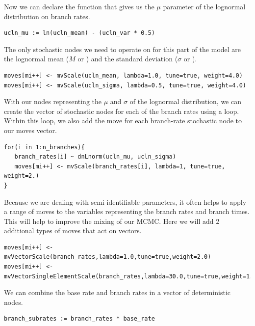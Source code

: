 Now we can declare the function that gives us the $\mu$ parameter of the lognormal distribution on branch rates.
{\tt \begin{snugshade*}
\begin{lstlisting}
ucln_mu := ln(ucln_mean) - (ucln_var * 0.5)
\end{lstlisting}
\end{snugshade*}}

The only stochastic nodes we need to operate on for this part of the model are the lognormal mean ($M$ or ) and the standard deviation ($\sigma$ or ).
{\tt \begin{snugshade*}
\begin{lstlisting}
moves[mi++] <- mvScale(ucln_mean, lambda=1.0, tune=true, weight=4.0)
moves[mi++] <- mvScale(ucln_sigma, lambda=0.5, tune=true, weight=4.0)
\end{lstlisting}
\end{snugshade*}}

With our nodes representing the $\mu$ and $\sigma$ of the lognormal distribution, we can create the vector of stochastic nodes for each of the branch rates using a  loop. 
Within this loop, we also add the move for each branch-rate stochastic node to our moves vector.
{\tt \begin{snugshade*}
\begin{lstlisting}
for(i in 1:n_branches){
   branch_rates[i] ~ dnLnorm(ucln_mu, ucln_sigma)
   moves[mi++] <- mvScale(branch_rates[i], lambda=1, tune=true, weight=2.)
}
\end{lstlisting}
\end{snugshade*}}

Because we are dealing with semi-identifiable parameters, it often helps to apply a range of moves to the variables representing the branch rates and branch times. This will help to improve the mixing of our MCMC.
Here we will add 2 additional types of moves that act on vectors.
{\tt \begin{snugshade*}
\begin{lstlisting}
moves[mi++] <- mvVectorScale(branch_rates,lambda=1.0,tune=true,weight=2.0) 
moves[mi++] <- mvVectorSingleElementScale(branch_rates,lambda=30.0,tune=true,weight=1.0) 
\end{lstlisting}
\end{snugshade*}}

We can combine the base rate and branch rates in a vector of deterministic nodes.
{\tt \begin{snugshade*}
\begin{lstlisting}
branch_subrates := branch_rates * base_rate
\end{lstlisting}
\end{snugshade*}}

